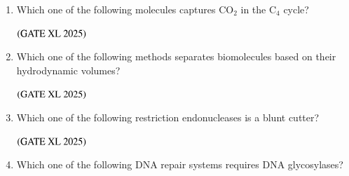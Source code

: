 \documentclass[journal]{IEEEtran}
\begin{document}
\begin{enumerate}
    \item Which one of the following molecules captures CO$_2$ in the C$_4$ cycle?

    \hfill $\left(\text{GATE XL 2025}\right)$

    \begin{enumerate}
    \end{enumerate}

    \item Which one of the following methods separates biomolecules based on their hydrodynamic volumes?

    \hfill $\left(\text{GATE XL 2025}\right)$

    \begin{enumerate}
    \end{enumerate}

    \item Which one of the following restriction endonucleases is a blunt cutter?

    \hfill $\left(\text{GATE XL 2025}\right)$

    \begin{enumerate}
    \end{enumerate}

    \item Which one of the following DNA repair systems requires DNA glycosylases?


\end{enumerate}
\end{document}
